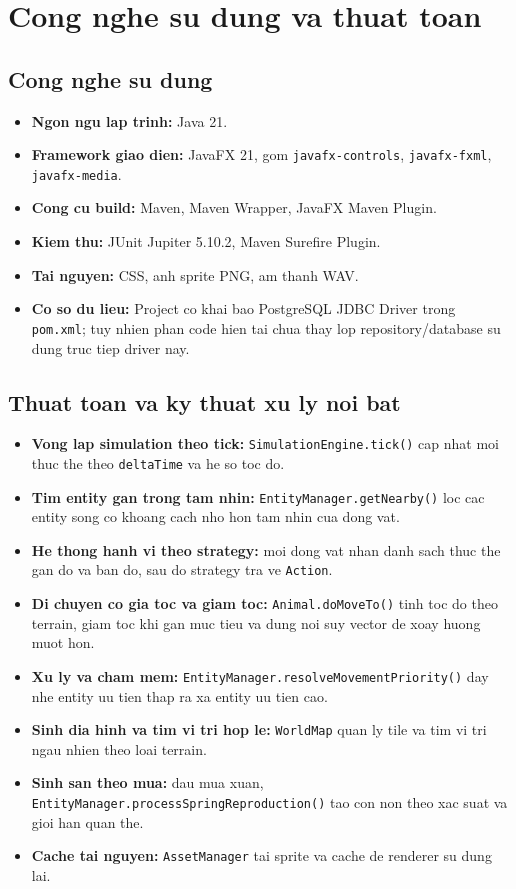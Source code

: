 \documentclass[12pt,a4paper]{article}
\begin{document}
\section{Cong nghe su dung va thuat toan}

\subsection{Cong nghe su dung}

\begin{itemize}
    \item \textbf{Ngon ngu lap trinh:} Java 21.
    \item \textbf{Framework giao dien:} JavaFX 21, gom \texttt{javafx-controls}, \texttt{javafx-fxml}, \texttt{javafx-media}.
    \item \textbf{Cong cu build:} Maven, Maven Wrapper, JavaFX Maven Plugin.
    \item \textbf{Kiem thu:} JUnit Jupiter 5.10.2, Maven Surefire Plugin.
    \item \textbf{Tai nguyen:} CSS, anh sprite PNG, am thanh WAV.
    \item \textbf{Co so du lieu:} Project co khai bao PostgreSQL JDBC Driver trong \texttt{pom.xml}; tuy nhien phan code hien tai chua thay lop repository/database su dung truc tiep driver nay.
\end{itemize}

\subsection{Thuat toan va ky thuat xu ly noi bat}

\begin{itemize}
    \item \textbf{Vong lap simulation theo tick:} \texttt{SimulationEngine.tick()} cap nhat moi thuc the theo \texttt{deltaTime} va he so toc do.
    \item \textbf{Tim entity gan trong tam nhin:} \texttt{EntityManager.getNearby()} loc cac entity song co khoang cach nho hon tam nhin cua dong vat.
    \item \textbf{He thong hanh vi theo strategy:} moi dong vat nhan danh sach thuc the gan do va ban do, sau do strategy tra ve \texttt{Action}.
    \item \textbf{Di chuyen co gia toc va giam toc:} \texttt{Animal.doMoveTo()} tinh toc do theo terrain, giam toc khi gan muc tieu va dung noi suy vector de xoay huong muot hon.
    \item \textbf{Xu ly va cham mem:} \texttt{EntityManager.resolveMovementPriority()} day nhe entity uu tien thap ra xa entity uu tien cao.
    \item \textbf{Sinh dia hinh va tim vi tri hop le:} \texttt{WorldMap} quan ly tile va tim vi tri ngau nhien theo loai terrain.
    \item \textbf{Sinh san theo mua:} dau mua xuan, \texttt{EntityManager.processSpringReproduction()} tao con non theo xac suat va gioi han quan the.
    \item \textbf{Cache tai nguyen:} \texttt{AssetManager} tai sprite va cache de renderer su dung lai.
\end{itemize}
\end{document}
